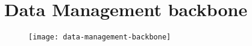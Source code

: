 

\section{Data Management backbone}

\begin{figure}[H]
    \texttt{[image: data-management-backbone]}
\end{figure}
